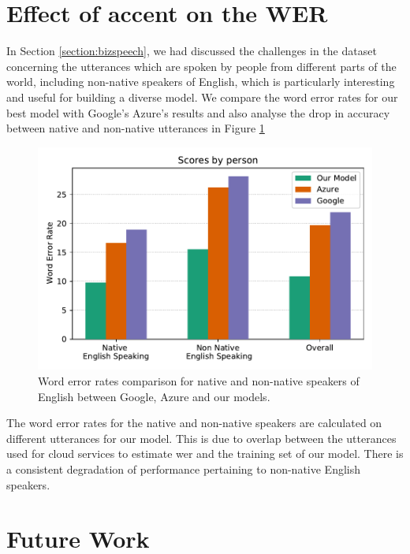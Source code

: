 \section{Effect of accent on the WER}
In Section \ref{section:bizspeech}, we had discussed the challenges in the dataset concerning the utterances which are spoken by people from different parts of the world, including non-native speakers of English, which is particularly interesting and useful for building a diverse model. We compare the word error rates for our best model with Google's Azure's results and also analyse the drop in accuracy between native and non-native utterances in Figure \ref{fig:wer_cloud_final} 

\begin{figure}[ht]
  \begin{center}
    \includegraphics[width=\textwidth]{images/wer_cloud_final.pdf} 
    \caption{Word error rates comparison for native and non-native speakers of English between Google, Azure and our models.}
    \label{fig:wer_cloud_final}
  \end{center}
\end{figure}

The word error rates for the native and non-native speakers are calculated on different utterances for our model. This is due to overlap between the utterances used for cloud services to estimate \acrshort{wer} and the training set of our model. There is a consistent degradation of performance pertaining to non-native English speakers. 


\section{Future Work}

